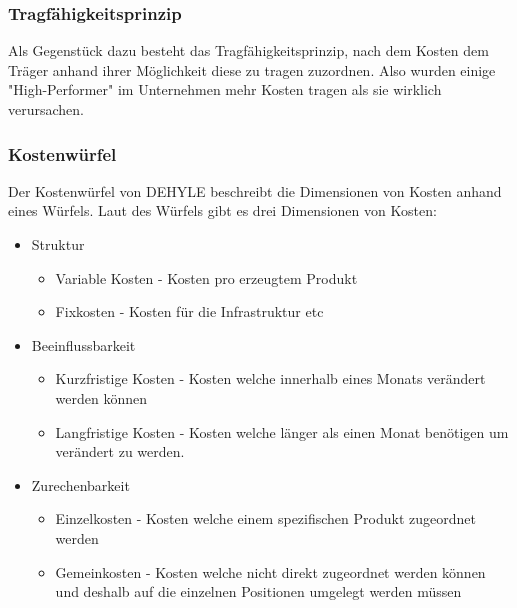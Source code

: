 \documentclass{article}
\begin{document}
	\subsubsection{Tragfähigkeitsprinzip}
	Als Gegenstück dazu besteht das Tragfähigkeitsprinzip, nach dem Kosten dem Träger anhand ihrer Möglichkeit diese zu tragen zuzordnen. Also wurden einige "High-Performer" im Unternehmen mehr Kosten tragen als sie wirklich verursachen.
	\subsubsection{Kostenwürfel}
	Der Kostenwürfel von DEHYLE beschreibt die Dimensionen von Kosten anhand eines Würfels. Laut des Würfels gibt es drei Dimensionen von Kosten:
	\begin{itemize}
		\item{Struktur}
		\begin{itemize}
			\item{Variable Kosten - Kosten pro erzeugtem Produkt}
			\item{Fixkosten - Kosten für die Infrastruktur etc}
		\end{itemize}
		\item{Beeinflussbarkeit}
		\begin{itemize}
			\item{Kurzfristige Kosten - Kosten welche innerhalb eines Monats verändert werden können}
			\item{Langfristige Kosten - Kosten welche länger als einen Monat benötigen um verändert zu werden.}
		\end{itemize}
		\item{Zurechenbarkeit}
		\begin{itemize}
			\item{Einzelkosten - Kosten welche einem spezifischen Produkt zugeordnet werden}
			\item{Gemeinkosten - Kosten welche nicht direkt zugeordnet werden können und deshalb auf die einzelnen Positionen umgelegt werden müssen}
		\end{itemize}
	\end{itemize}
\end{document}
